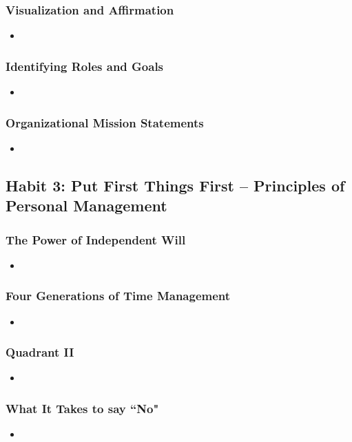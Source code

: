 \documentclass[11pt]{article}
\begin{document}
\subsubsection{Visualization and Affirmation}
\begin{itemize}
\item 
\end{itemize}
\subsubsection{Identifying Roles and Goals}
\begin{itemize}
\item 
\end{itemize}
\subsubsection{Organizational Mission Statements}
\begin{itemize}
\item 
\end{itemize}
\subsection{Habit 3: Put First Things First -- Principles of Personal Management}
\subsubsection{The Power of Independent Will}
\begin{itemize}
\item 
\end{itemize}
\subsubsection{Four Generations of Time Management}
\begin{itemize}
\item 
\end{itemize}
\subsubsection{Quadrant II}
\begin{itemize}
\item 
\end{itemize}
\subsubsection{What It Takes to say ``No"}
\begin{itemize}
\item 
\end{itemize}
\end{document}
